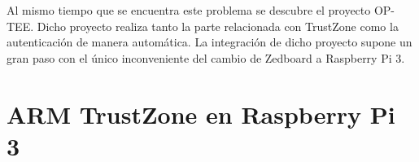 Al mismo tiempo que se encuentra este problema se descubre el proyecto OP-TEE. Dicho proyecto realiza tanto la parte relacionada con TrustZone como la autenticación de manera automática. La integración de dicho proyecto supone un gran paso con el único inconveniente del cambio de Zedboard a Raspberry Pi 3.



\section{ARM TrustZone en Raspberry Pi 3}

